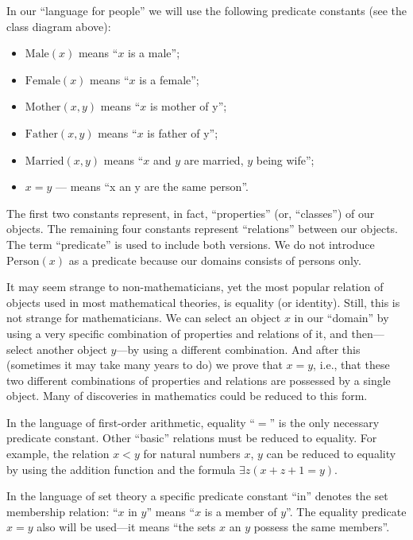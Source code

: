 \begin{example}
In our ``language for people'' we will use the following predicate constants (see the class diagram above):
\begin{itemize}
    \item \(\mathrm{Male}(x)\) means ``\(x\) is a male'';
    \item \(\mathrm{Female}(x)\) means ``\(x\) is a female'';
    \item \(\mathrm{Mother}(x, y)\) means ``\(x\) is mother of y'';
    \item \(\mathrm{Father}(x, y)\) means ``\(x\) is father of y'';
    \item \(\mathrm{Married}(x, y)\) means ``\(x\) and \(y\) are married, \(y\) being wife'';
    \item \(x=y\) --- means ``x an y are the same person''.
\end{itemize}

The first two constants represent, in fact, ``properties'' (or, ``classes'') of our objects.
The remaining four constants represent ``relations'' between our objects.
The term ``predicate'' is used to include both versions.
We do not introduce \(\mathrm{Person}(x)\) as a predicate because our domains consists of persons only.
\end{example}

\begin{example}
It may seem strange to non-mathematicians, yet the most popular relation of objects used in most mathematical theories, is equality (or identity).
Still, this is not strange for mathematicians.
We can select an object \(x\) in our ``domain'' by using a very specific combination of properties and relations of it, and then---select another object \(y\)---by using a different combination.
And after this (sometimes it may take many years to do) we prove that \(x=y\), i.e., that these two different combinations of properties and relations are possessed by a single object.
Many of discoveries in mathematics could be reduced to this form.

In the language of first-order arithmetic, equality ``\(=\)'' is the only necessary predicate constant.
Other ``basic'' relations must be reduced to equality.
For example, the relation \(x<y\) for natural numbers \(x\), \(y\) can be reduced to equality by using the addition function and the formula \(\exists z(x+z+1=y)\).
\end{example}

\begin{example}
In the language of set theory a specific predicate constant ``in'' denotes the set membership relation: ``\(x\) in \(y\)'' means ``\(x\) is a member of \(y\)''.
The equality predicate \(x=y\) also will be used---it means ``the sets \(x\) an \(y\) possess the same members''.
\end{example}

